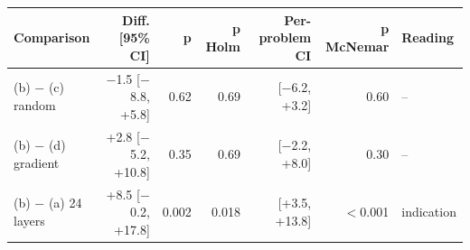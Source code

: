 \begin{tabular}{lrrrrrl}
\toprule
\textbf{Comparison} & \textbf{Diff. [95\% CI]} & \textbf{p} & \textbf{p Holm} & \textbf{Per-problem CI} & \textbf{p McNemar} & \textbf{Reading} \\
\midrule
(b) $-$ (c) random & $-$1.5 [$-$8.8, +5.8] & 0.62 & 0.69 & [$-$6.2, +3.2] & 0.60 & -- \\
(b) $-$ (d) gradient & +2.8 [$-$5.2, +10.8] & 0.35 & 0.69 & [$-$2.2, +8.0] & 0.30 & -- \\
(b) $-$ (a) 24 layers & +8.5 [$-$0.2, +17.8] & 0.002 & 0.018 & [+3.5, +13.8] & $<$0.001 & indication \\
\bottomrule
\end{tabular}
